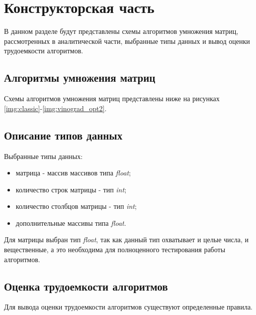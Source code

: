 \chapter{Конструкторская часть}
В данном разделе будут представлены схемы алгоритмов умножения матриц, рассмотренных в аналитической части, выбранные типы данных и вывод оценки трудоемкости алгоритмов.

\section{Алгоритмы умножения матриц}
Схемы алгоритмов умножения матриц представлены ниже на рисунках \ref{img:classic}-\ref{img:vinograd_opt2}.

\clearpage


\section{Описание типов данных}
Выбранные типы данных:

\begin{itemize}
    \item матрица - массив массивов типа \textit{float};
    \item количество строк матрицы - тип \textit{int};
    \item количество столбцов матрицы - тип \textit{int};
    \item дополнительные массивы типа \textit{float}.
\end{itemize}

Для матрицы выбран тип \textit{float}, так как данный тип охватывает и целые числа, и вещественные, а это необходима для полноценного тестирования работы алгоритмов.


\section{Оценка трудоемкости алгоритмов}
Для вывода оценки трудоемкости алгоритмов существуют определенные правила.

